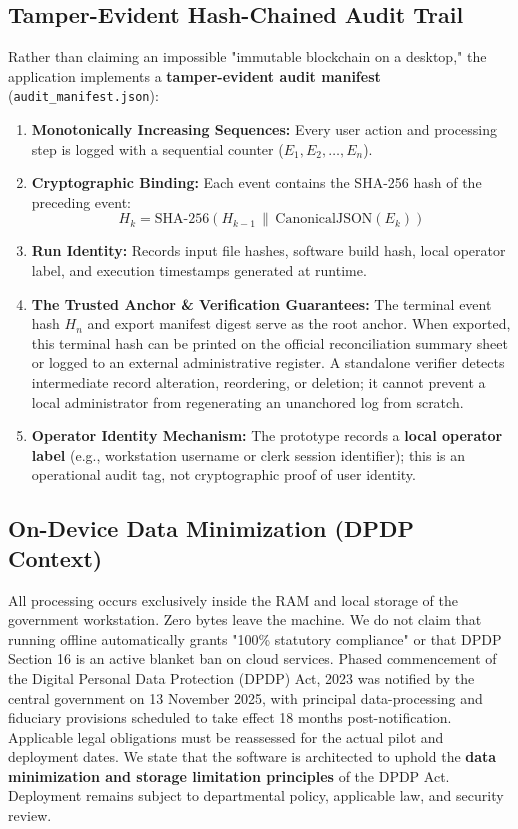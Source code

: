 \documentclass[11pt,a4paper]{article}
\newcommand{\code}[1]{\texttt{#1}}
\begin{document}
\subsection{Tamper-Evident Hash-Chained Audit Trail}
Rather than claiming an impossible "immutable blockchain on a desktop," the application implements a \textbf{tamper-evident audit manifest} (\code{audit\_manifest.json}):
\begin{enumerate}
    \item \textbf{Monotonically Increasing Sequences:} Every user action and processing step is logged with a sequential counter ($E_1, E_2, \dots, E_n$).
    \item \textbf{Cryptographic Binding:} Each event contains the SHA-256 hash of the preceding event:
    \begin{equation}
        H_k = \text{SHA-256}(H_{k-1} \,\|\, \text{CanonicalJSON}(E_k))
    \end{equation}
    \item \textbf{Run Identity:} Records input file hashes, software build hash, local operator label, and execution timestamps generated at runtime.
    \item \textbf{The Trusted Anchor \& Verification Guarantees:} The terminal event hash $H_n$ and export manifest digest serve as the root anchor. When exported, this terminal hash can be printed on the official reconciliation summary sheet or logged to an external administrative register. A standalone verifier detects intermediate record alteration, reordering, or deletion; it cannot prevent a local administrator from regenerating an unanchored log from scratch.
    \item \textbf{Operator Identity Mechanism:} The prototype records a \textbf{local operator label} (e.g., workstation username or clerk session identifier); this is an operational audit tag, not cryptographic proof of user identity.
\end{enumerate}

\subsection{On-Device Data Minimization (DPDP Context)}
All processing occurs exclusively inside the RAM and local storage of the government workstation. Zero bytes leave the machine. We do not claim that running offline automatically grants "100\% statutory compliance" or that DPDP Section 16 is an active blanket ban on cloud services. Phased commencement of the Digital Personal Data Protection (DPDP) Act, 2023 was notified by the central government on 13 November 2025, with principal data-processing and fiduciary provisions scheduled to take effect 18 months post-notification. Applicable legal obligations must be reassessed for the actual pilot and deployment dates. We state that the software is architected to uphold the \textbf{data minimization and storage limitation principles} of the DPDP Act. Deployment remains subject to departmental policy, applicable law, and security review.
\end{document}
